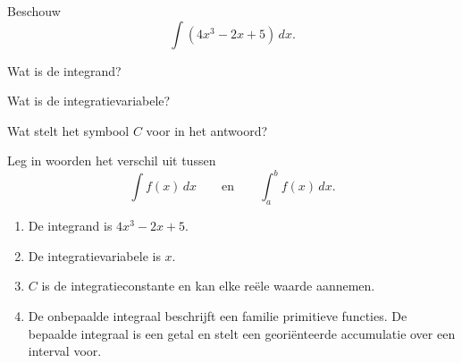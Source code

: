 \documentclass{ximera}
\begin{document}
\begin{oefening}{\oefB}

Beschouw
\[
\int (4x^3-2x+5)\,dx.
\]

\begin{question}
Wat is de integrand?
\end{question}

\begin{question}
Wat is de integratievariabele?
\end{question}

\begin{question}
Wat stelt het symbool $C$ voor in het antwoord?
\end{question}

\begin{question}
Leg in woorden het verschil uit tussen
\[
\int f(x)\,dx
\qquad\text{en}\qquad
\int_a^b f(x)\,dx.
\]
\end{question}

\begin{oplossing}

\begin{enumerate}
\item De integrand is $4x^3-2x+5$.
\item De integratievariabele is $x$.
\item $C$ is de integratieconstante en kan elke reële waarde aannemen.
\item De onbepaalde integraal beschrijft een familie primitieve functies. De bepaalde integraal is een getal en stelt een georiënteerde accumulatie over een interval voor.
\end{enumerate}

\end{oplossing}

\end{oefening}


\end{document}
